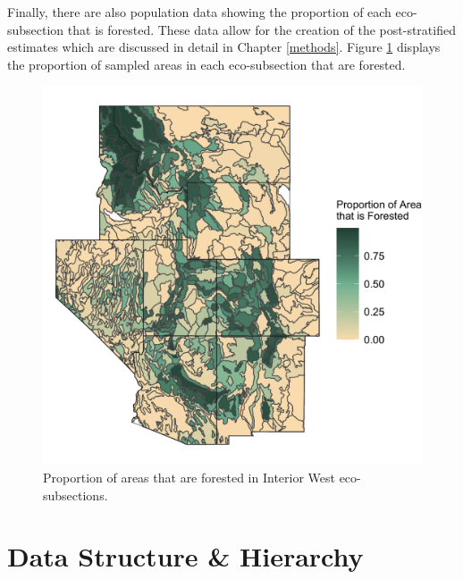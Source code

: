 \documentclass[12pt,twoside]{reedthesis}
\begin{document}
Finally, there are also population data showing the proportion of each eco-subsection that is forested. These data allow for the creation of the post-stratified estimates which are discussed in detail in Chapter \ref{methods}. Figure \ref{fig:strata-plot} displays the proportion of sampled areas in each eco-subsection that are forested.
\begin{figure}

{\centering \includegraphics[width=0.65\linewidth]{figure/strata_plot} 

}

\caption[Proportion of areas that are forested in Interior West eco-subsections]{Proportion of areas that are forested in Interior West eco-subsections.}\label{fig:strata-plot}
\end{figure}
\clearpage

\hypertarget{data-structure-hierarchy}{%
\section{Data Structure \& Hierarchy}\label{data-structure-hierarchy}}
\end{document}
